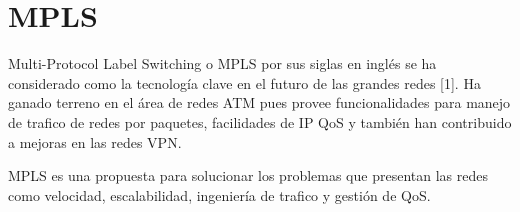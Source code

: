\documentclass[10pt,journal,compsoc]{IEEEtran}
\begin{document}




% 
% 
% 
% 


\section {MPLS}



Multi-Protocol Label Switching o MPLS por sus siglas en inglés se ha considerado como la tecnología clave en el futuro de las grandes redes [1]. Ha ganado terreno en el área de redes ATM pues provee funcionalidades para manejo de trafico de redes por paquetes, facilidades de IP QoS y también han contribuido a mejoras en las redes VPN. 

MPLS es una propuesta para solucionar los problemas que presentan las redes como velocidad, escalabilidad, ingeniería de trafico y gestión de QoS.
\end{document}

